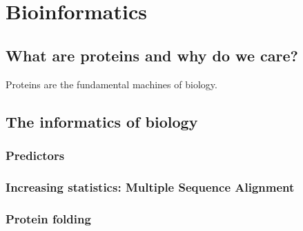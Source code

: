 \chapter{Bioinformatics}
\section{What are proteins and why do we care?}
Proteins are the fundamental machines of biology.


\section{The informatics of biology}


\subsection{Predictors}

\subsection{Increasing statistics: Multiple Sequence Alignment}

\subsection{Protein folding}
